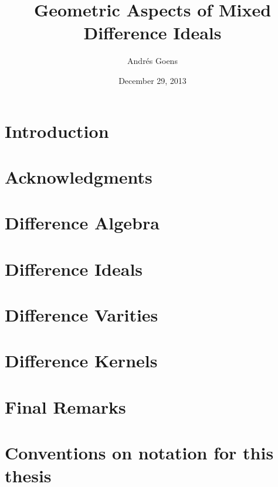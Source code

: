 \documentclass[12pt,a4paper,BCOR15mm,twoside,DIV12]{article}
\title{Geometric Aspects of Mixed Difference Ideals}
\author{Andr\'{e}s Goens}
\date{December 29, 2013}
\theoremstyle{plain}
\theoremstyle{definition}
\begin{document}
\setlength{\parindent}{1.5em}

 \maketitle

\clearpage
\section*{Introduction}

\clearpage
\section*{Acknowledgments}

\clearpage

\tableofcontents

\clearpage 



\section{Difference Algebra}

\clearpage 
\section{Difference Ideals}



\clearpage 

\section{Difference Varities}

\clearpage 
\section{Difference Kernels}


\clearpage


\section{Final Remarks}

\clearpage

\begin{appendices}

\end{appendices}

\clearpage 


\clearpage
\section*{Conventions on notation for this thesis} 
%

\clearpage
\printindex
\end{document}
